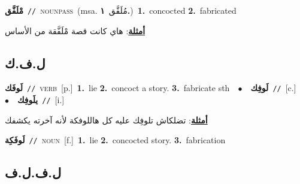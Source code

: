 \documentclass[10pt,a4paper,twoside]{article} %
\begin{document}
\begin{multicols}{2}
{\setlength\topsep{0pt}\textbf{\foreignlanguage{arabic}{مْلَفَّق}}\ {\color{gray}\texttt{//}\color{black}}\ \textsc{noun\textunderscore pass}\ \color{gray}(msa. \foreignlanguage{arabic}{مُلَفَّق}~\foreignlanguage{arabic}{\textbf{١.}})\color{black}\ \textbf{1.}~concocted  \textbf{2.}~fabricated\  \begin{flushright}\color{gray}\foreignlanguage{arabic}{\textbf{\underline{\foreignlanguage{arabic}{أمثلة}}}: هاي كانت قصة مْلَفَّقة من الأساس}\end{flushright}\color{black}} \vspace{2mm}

\vspace{-3mm}
\subsection*{\color{blue}\foreignlanguage{arabic}{ل.ف.ك}\color{blue}{}} 

{\setlength\topsep{0pt}\textbf{\foreignlanguage{arabic}{لَوفَك}}\ {\color{gray}\texttt{//}\color{black}}\ \textsc{verb}\ [p.]\ \textbf{1.}~lie  \textbf{2.}~concoct a story.  \textbf{3.}~fabricate sth\ \ $\bullet$\ \ \setlength\topsep{0pt}\textbf{\foreignlanguage{arabic}{لَوفِك}}\ {\color{gray}\texttt{//}\color{black}}\ [c.]\ \ $\bullet$\ \ \setlength\topsep{0pt}\textbf{\foreignlanguage{arabic}{يلَوفِك}}\ {\color{gray}\texttt{//}\color{black}}\ [i.]\  \begin{flushright}\color{gray}\foreignlanguage{arabic}{\textbf{\underline{\foreignlanguage{arabic}{أمثلة}}}: تضلكاش تلوفِك عليه كل هاللوفكة لأنه آخرته يكشفك}\end{flushright}\color{black}} \vspace{2mm}

{\setlength\topsep{0pt}\textbf{\foreignlanguage{arabic}{لَوفَكِة}}\ {\color{gray}\texttt{//}\color{black}}\ \textsc{noun}\ [f.]\ \textbf{1.}~lie  \textbf{2.}~concocted story.  \textbf{3.}~fabrication\ } \vspace{2mm}

\vspace{-3mm}
\subsection*{\color{blue}\foreignlanguage{arabic}{ل.ف.ل.ف}\color{blue}{}} 


\end{multicols}
\end{document}
